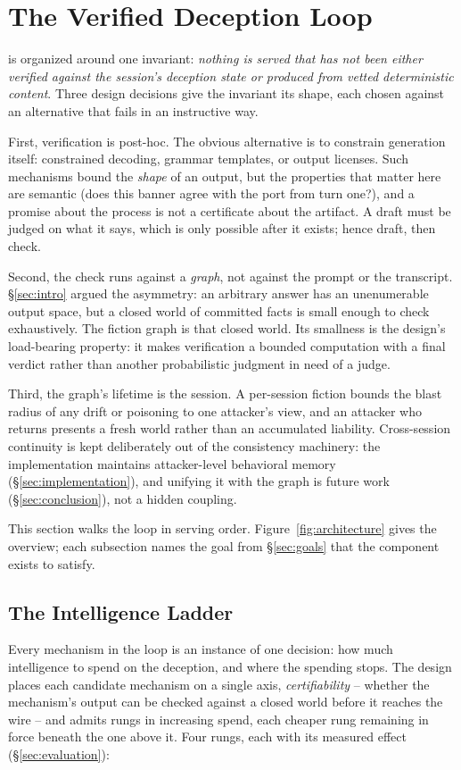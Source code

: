 \section{The Verified Deception Loop}
\label{sec:design}

\RAGIN is organized around one invariant: \emph{nothing is served that has
not been either verified against the session's deception state or produced
from vetted deterministic content}. Three design decisions give the
invariant its shape, each chosen against an alternative that fails in an
instructive way.

First, verification is post-hoc. The obvious alternative is to constrain
generation itself: constrained decoding, grammar templates, or output
licenses. Such mechanisms bound the \emph{shape} of an output, but the
properties that matter here are semantic (does this banner agree with the
port from turn one?), and a promise about the process is not a
certificate about the artifact. A draft must be judged on what it says,
which is only possible after it exists; hence draft, then check.

Second, the check runs against a \emph{graph}, not against the prompt or
the transcript. \S\ref{sec:intro} argued the asymmetry: an arbitrary
answer has an unenumerable output space, but a closed world of committed
facts is small enough to check exhaustively. The fiction graph is that
closed world. Its smallness is the design's load-bearing property: it
makes verification a bounded computation with a final verdict rather
than another probabilistic judgment in need of a judge.

Third, the graph's lifetime is the session. A per-session fiction bounds
the blast radius of any drift or poisoning to one attacker's view, and an
attacker who returns presents a fresh world rather than an accumulated
liability. Cross-session continuity is kept deliberately out of the
consistency machinery: the implementation maintains attacker-level
behavioral memory (\S\ref{sec:implementation}), and unifying it with the
graph is future work (\S\ref{sec:conclusion}), not a hidden coupling.

This section walks the loop in serving
order. Figure~\ref{fig:architecture} gives the overview; each subsection
names the goal from \S\ref{sec:goals} that the component exists to satisfy.

\subsection{The Intelligence Ladder}
\label{sec:ladder}
Every mechanism in the loop is an instance of one decision: how much
intelligence to spend on the deception, and where the spending stops.
The design places each candidate mechanism on a single axis,
\emph{certifiability} -- whether the mechanism's output can be checked
against a closed world before it reaches the wire -- and admits rungs in
increasing spend, each cheaper rung remaining in force beneath the one
above it. Four rungs, each with its measured effect
(\S\ref{sec:evaluation}):

